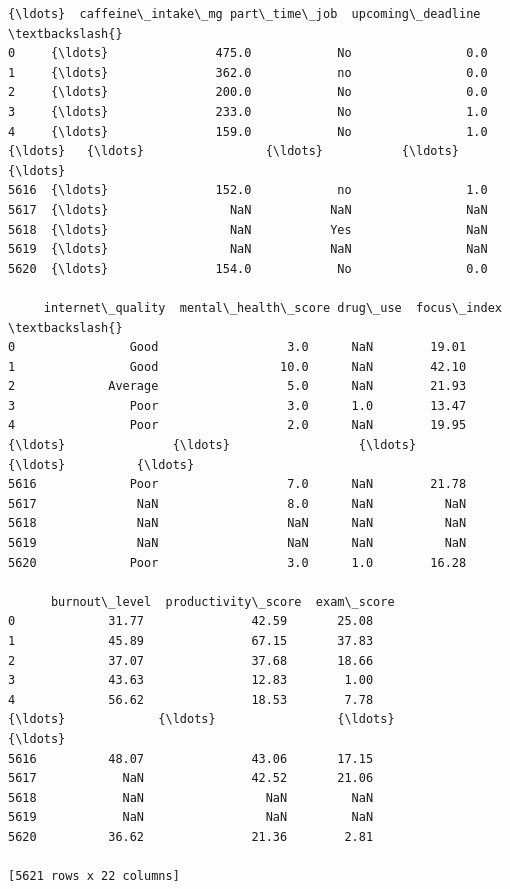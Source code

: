 \documentclass[11pt]{article}
\begin{document}
\begin{tcolorbox}[breakable, size=fbox, boxrule=.5pt, pad at break*=1mm, opacityfill=0]
\begin{Verbatim}[commandchars=\\\{\}]
      {\ldots}  caffeine\_intake\_mg part\_time\_job  upcoming\_deadline  \textbackslash{}
0     {\ldots}               475.0            No                0.0
1     {\ldots}               362.0            no                0.0
2     {\ldots}               200.0            No                0.0
3     {\ldots}               233.0            No                1.0
4     {\ldots}               159.0            No                1.0
{\ldots}   {\ldots}                 {\ldots}           {\ldots}                {\ldots}
5616  {\ldots}               152.0            no                1.0
5617  {\ldots}                 NaN           NaN                NaN
5618  {\ldots}                 NaN           Yes                NaN
5619  {\ldots}                 NaN           NaN                NaN
5620  {\ldots}               154.0            No                0.0

     internet\_quality  mental\_health\_score drug\_use  focus\_index  \textbackslash{}
0                Good                  3.0      NaN        19.01
1                Good                 10.0      NaN        42.10
2             Average                  5.0      NaN        21.93
3                Poor                  3.0      1.0        13.47
4                Poor                  2.0      NaN        19.95
{\ldots}               {\ldots}                  {\ldots}      {\ldots}          {\ldots}
5616             Poor                  7.0      NaN        21.78
5617              NaN                  8.0      NaN          NaN
5618              NaN                  NaN      NaN          NaN
5619              NaN                  NaN      NaN          NaN
5620             Poor                  3.0      1.0        16.28

      burnout\_level  productivity\_score  exam\_score
0             31.77               42.59       25.08
1             45.89               67.15       37.83
2             37.07               37.68       18.66
3             43.63               12.83        1.00
4             56.62               18.53        7.78
{\ldots}             {\ldots}                 {\ldots}         {\ldots}
5616          48.07               43.06       17.15
5617            NaN               42.52       21.06
5618            NaN                 NaN         NaN
5619            NaN                 NaN         NaN
5620          36.62               21.36        2.81

[5621 rows x 22 columns]
\end{Verbatim}
\end{tcolorbox}
        
\end{document}
